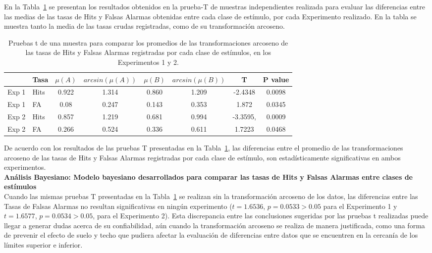 En la Tabla~\ref{Tabla_t-HitsyFA} se presentan los resultados obtenidos en la prueba-T de muestras independientes realizada para evaluar las diferencias entre las medias de las tasas de Hits y Falsas Alarmas obtenidas entre cada clase de estímulo, por cada Experimento realizado. En la tabla se muestra tanto la media de las tasas crudas registradas, como de su transformación arcoseno.\\

\begin{table}
\caption[Prueba t para evaluar las diferencias entre las tasas de Hits y Falsas Alarmas registradas en promedio por cada clase de estímulos]{Pruebas t de una muestra para comparar los promedios de las transformaciones arcoseno de las tasas de Hits y Falsas Alarmas registradas por cada clase de estímulos, en los Experimentos 1 y 2.}
\label{Tabla_t-HitsyFA}
\centering
\begin{tabular}{l l | c c c c c c}
\toprule
\textbf{} & \textbf{Tasa} & \textbf{$\mu(A)$} & \textbf{$arcsin(\mu(A))$} & \textbf{$\mu(B)$} & \textbf{$arcsin(\mu(B))$} &\textbf{T} & \textbf{P value}\\
\midrule
Exp 1 & Hits & 0.922 & 1.314 & 0.860 & 1.209 & -2.4348 & 0.0098 \\
Exp 1 & FA & 0.08 & 0.247 & 0.143 & 0.353 & 1.872 & 0.0345 \\
Exp 2 & Hits & 0.857 & 1.219 & 0.681 & 0.994 & -3.3595, & 0.0009 \\
Exp 2 & FA & 0.266 & 0.524 & 0.336 & 0.611 & 1.7223 & 0.0468 \\
\bottomrule
\end{tabular}
\end{table}

De acuerdo con los resultados de las pruebas T presentadas en la Tabla~\ref{Tabla_t-HitsyFA}, las diferencias entre el promedio de las transformaciones arcoseno de las tasas de Hits y Falsas Alarmas registradas por cada clase de estímulo, son estadísticamente significativas en ambos experimentos.\\

\textbf{Análisis Bayesiano: Modelo bayesiano desarrollados para comparar las tasas de Hits y Falsas Alarmas entre clases de estímulos}\\

Cuando las mismas pruebas T presentadas en la Tabla~\ref{Tabla_t-HitsyFA} se realizan sin la transformación arcoseno de los datos, las diferencias entre las Tasas de Falsas Alarmas no resultan significativas en ningún experimento ($t=1.6536$, $p=0.0533>0.05$ para el Experimento 1 y $t=1.6577$, $p=0.0534>0.05$, para el Experimento 2). Esta discrepancia entre las conclusiones sugeridas por las pruebas t realizadas puede llegar a generar dudas acerca de su confiabilidad, aún cuando la transformación arcoseno se realiza de manera justificada, como una forma de prevenir el efecto de suelo y techo que pudiera afectar la evaluación de diferencias entre datos que se encuentren en la cercanía de los límites superior e inferior.\\

